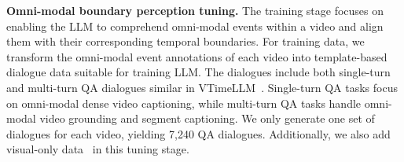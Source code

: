 \noindent\textbf{Omni-modal boundary perception tuning.} The training stage focuses on enabling the LLM to comprehend omni-modal events within a video and align them with their corresponding temporal boundaries.  
For training data, we transform the omni-modal event annotations of each video into template-based dialogue data suitable for training LLM. The dialogues include both single-turn and multi-turn QA dialogues similar in VTimeLLM~\cite{huang2024vtimellm}. Single-turn QA tasks focus on omni-modal dense video captioning, while multi-turn QA tasks handle omni-modal video grounding and segment captioning. 
We only generate one set of dialogues for each video, yielding 7,240 QA dialogues. Additionally, we also add visual-only data~\cite{huang2024vtimellm} in this tuning stage.


\begin{table}
  \centering
\end{table}
